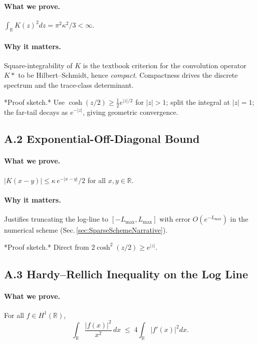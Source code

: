 \documentclass[11pt]{article}
\begin{document}
\paragraph{What we prove.}  
\(\displaystyle\int_{\mathbb R} K(z)^{2}dz
   =\pi^{2}\kappa^{2}/3 < \infty.\)

\paragraph{Why it matters.}  
Square-integrability of \(K\) is the textbook criterion for the
convolution operator \(K\!\ast\) to be Hilbert–Schmidt, hence
\emph{compact}.  Compactness drives the discrete spectrum and the
trace-class determinant.

*Proof sketch.*  
Use \(\cosh(z/2)\ge \tfrac12e^{|z|/2}\) for \(|z|\!>\!1\); split the
integral at \(|z|=1\); the far-tail decays as \(e^{-|z|}\), giving
geometric convergence.

\vspace{1em}
\subsection*{A.2  Exponential-Off-Diagonal Bound}

\paragraph{What we prove.}  
\(|K(x-y)| \le \kappa\,e^{-|x-y|}/2\) for all \(x,y\in\mathbb R\).

\paragraph{Why it matters.}  
Justifies truncating the log-line to \([-L_{\max},L_{\max}]\) with
error \(O(e^{-L_{\max}})\) in the numerical scheme
(Sec.\,\ref{sec:SparseSchemeNarrative}).

*Proof sketch.*  
Direct from \(2\cosh^{2}(z/2)\ge e^{|z|}\).

\vspace{1em}
\subsection*{A.3  Hardy–Rellich Inequality on the Log Line}

\paragraph{What we prove.}  
For all \(f\in H^{1}(\mathbb R)\),
\[
     \int_{\mathbb R}\frac{|f(x)|^{2}}{x^{2}}\,dx
     \;\le\;
     4 \int_{\mathbb R} |f'(x)|^{2}dx.
\]
\end{document}
